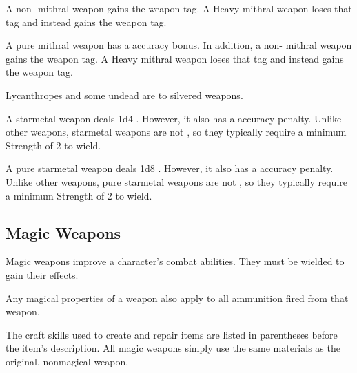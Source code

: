        A non- mithral weapon gains the  weapon tag.
      A Heavy mithral weapon loses that tag and instead gains the  weapon tag.

       A pure mithral weapon has a  accuracy bonus.
      In addition, a non- mithral weapon gains the  weapon tag.
      A Heavy mithral weapon loses that tag and instead gains the  weapon tag.

       Lycanthropes and some undead are  to silvered weapons.

       A starmetal weapon deals \plus1d4 .
      However, it also has a  accuracy penalty.
      Unlike other weapons, starmetal weapons are not , so they typically require a minimum Strength of 2 to wield.

       A pure starmetal weapon deals \plus1d8 .
      However, it also has a  accuracy penalty.
      Unlike other weapons, pure starmetal weapons are not , so they typically require a minimum Strength of 2 to wield.

      \begin{longcolumn}
        \section{Magic Weapons}\label{Magic Weapons}
          \begin{longtablepreface}

            Magic weapons improve a character's combat abilities.
            They must be wielded to gain their effects.

             Any magical properties of a  weapon also apply to all ammunition fired from that weapon.

             The craft skills used to create and repair items are listed in parentheses before the item's description.
            All magic weapons simply use the same materials as the original, nonmagical weapon.
          \end{longtablepreface}

          

      \end{longcolumn}

